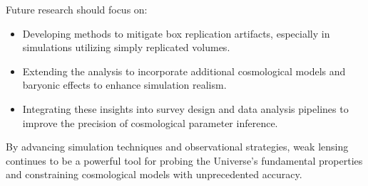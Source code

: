 Future research should focus on: 
\begin{itemize} 
    \item Developing methods to mitigate box replication artifacts, especially in simulations utilizing simply replicated volumes. 
    \item Extending the analysis to incorporate additional cosmological models and baryonic effects to enhance simulation realism. 
    \item Integrating these insights into survey design and data analysis pipelines to improve the precision of cosmological parameter inference. 
\end{itemize}

By advancing simulation techniques and observational strategies, weak lensing continues to be a powerful tool for probing the Universe's fundamental properties and constraining cosmological models with unprecedented accuracy.
